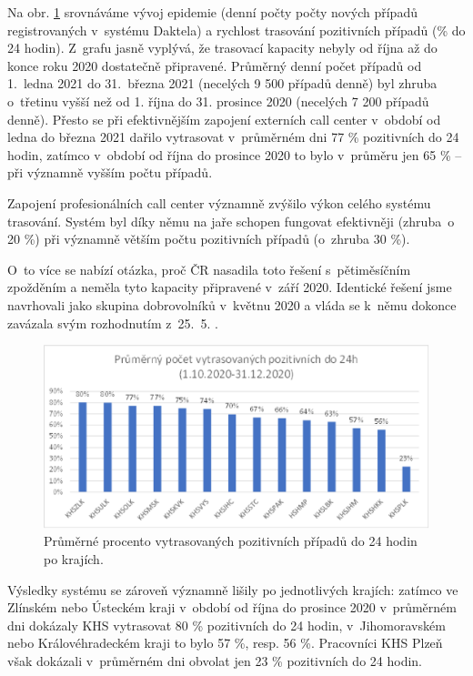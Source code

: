 Na obr. \ref{fig:pozitivni24_3} srovnáváme vývoj epidemie (denní počty počty nových případů registrovaných v~systému Daktela) a rychlost trasování pozitivních případů (\% do 24 hodin). Z~grafu jasně vyplývá, že trasovací kapacity nebyly od října až do konce roku 2020 dostatečně připravené. Průměrný denní počet případů od 1.~ledna 2021 do 31.~března 2021 (necelých 9 500 případů denně) byl zhruba o~třetinu vyšší než od 1. října do 31. prosince 2020 (necelých 7 200 případů denně). Přesto se při efektivnějším zapojení externích call center v~období od ledna do března 2021 dařilo vytrasovat v~průměrném dni 77 \% pozitivních do 24 hodin, zatímco v~období od října do prosince 2020 to bylo v~průměru jen 65 \% -- při významně vyšším počtu případů.

Zapojení profesionálních call center významně zvýšilo výkon celého systému trasování. Systém byl díky němu na jaře schopen fungovat efektivněji (zhruba~o 20 \%) při významně větším počtu pozitivních případů (o~zhruba 30 \%).

O~to více se nabízí otázka, proč ČR nasadila toto řešení s~pětiměsíčním zpožděním a neměla tyto kapacity připravené v~září 2020. Identické řešení jsme navrhovali jako skupina dobrovolníků v~květnu 2020 \cite{tr_hlidac02} a vláda se k~němu dokonce zavázala svým rozhodnutím z~25.~5. \cite{tr_vlada01}.

\begin{figure}[ht]
    \centering
    \includegraphics[width=1\textwidth]{./pic/c.eps}
    \caption{Průměrné procento vytrasovaných pozitivních případů do 24 hodin po krajích.}
    \label{fig:pozitivni24_3}
\end{figure}

Výsledky systému se zároveň významně lišily po jednotlivých krajích: zatímco ve Zlínském nebo Ústeckém kraji v~období od října do prosince 2020 v~průměrném dni dokázaly KHS vytrasovat 80 \% pozitivních do 24 hodin, v~Jihomoravském nebo Královéhradeckém kraji to bylo 57 \%, resp. 56 \%. Pracovníci KHS Plzeň však dokázali v~průměrném dni obvolat jen 23 \% pozitivních do 24 hodin.

